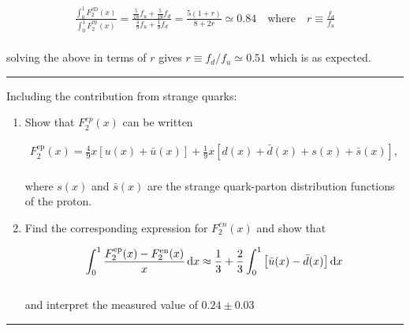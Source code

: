\begin{solution}
    \begin{align*}
        \frac{\int_0^1 F_2^\text{eD}(x)}{\int_0^1 F_2^\text{ep}(x)} = \frac{\frac{5}{18}f_u + \frac{5}{18}f_d}{\frac{4}{9}f_u + \frac{1}{9}f_d} = \frac{5(1+r)}{8+2r} \simeq 0.84 \quad \text{where} \quad r \equiv \frac{f_d}{f_u}
    \end{align*}\\
    solving the above in terms of $r$ gives $\boxed{r\equiv f_d/f_u \simeq 0.51}$ which is as expected.
\end{solution}

\noindent\rule{7in}{1.5pt}


\begin{problem}{8.7}
    Including the contribution from strange quarks:

    \begin{enumerate}[label=(\alph*)]
        \item Show that $F_2^{ep}(x)$ can be written 
        
        \begin{align*}
            F_2^{\text{ep}}(x) = \frac{4}{9} x \left[ u(x) + \bar{u}(x) \right] + \frac{1}{9} x \left[ d(x) + \bar{d}(x) + s(x) + \bar{s}(x) \right],
        \end{align*}\\
        where $s(x)$ and $\bar{s}(x)$ are the strange quark-parton distribution functions of the proton.
        \item Find the corresponding expression for $F_2^{en}(x)$ and show that
        
        \begin{align*}
            \int_0^1 \frac{F^{\text{ep}}_2(x)-F^{\text{en}}_2(x)}{x} \mathop{}\!\mathrm{d} x \approx \frac{1}{3} + \frac{2}{3} \int_0^1 \left[ \bar{u}(x) - \bar{d}(x) \right] \mathop{}\!\mathrm{d} x
        \end{align*}\\
        and interpret the measured value of $0.24\pm 0.03$
    \end{enumerate}
\end{problem}
\begin{solution}

\end{solution}

\noindent\rule{7in}{1.5pt}


